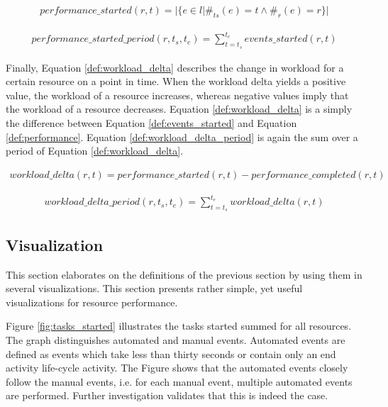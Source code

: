 \begin{equation}\label{def:events_started}
  \begin{array}{l}
    performance\_started(r,t) =
   | \{e \in l | \#_{ts}(e) = t \wedge \#_{r}(e)=r \}| 
  \end{array}
\end{equation}

\begin{equation}\label{def:events_started_period}
  \begin{array}{l}
    performance\_started\_period(r,t_s,t_e) = \sum_{t = t_s}^{t_e} events\_started(r,t)
  \end{array}
\end{equation}

Finally, Equation \ref{def:workload_delta} describes the change in workload for a certain resource on a point in time. When the workload delta yields a positive value, the workload of a resource increases, whereas negative values imply that the workload of a resource decreases. Equation \ref{def:workload_delta} is a simply the difference between Equation \ref{def:events_started} and Equation \ref{def:performance}. Equation \ref{def:workload_delta_period} is again the sum over a period of Equation \ref{def:workload_delta}.

\begin{equation}\label{def:workload_delta}
  \begin{array}{l}
    workload\_delta(r,t) =  performance\_started(r,t) - performance\_completed(r,t) 
  \end{array}
\end{equation}

\begin{equation}\label{def:workload_delta_period}
  \begin{array}{l}
    workload\_delta\_period(r,t_s,t_e) = \sum_{t = t_s}^{t_e} workload\_delta(r,t)
  \end{array}
\end{equation}


\subsection{Visualization}
This section elaborates on the definitions of the previous section by using them in several visualizations. This section presents rather simple, yet useful visualizations for resource performance. 

Figure \ref{fig:tasks_started} illustrates the tasks started summed for all resources. The graph distinguishes automated and manual events. Automated events are defined as events which take less than thirty seconds or contain only an end activity life-cycle activity. The Figure shows that the automated events closely follow the manual events, i.e. for each manual event, multiple automated events are performed. Further investigation validates that this is indeed the case.   

